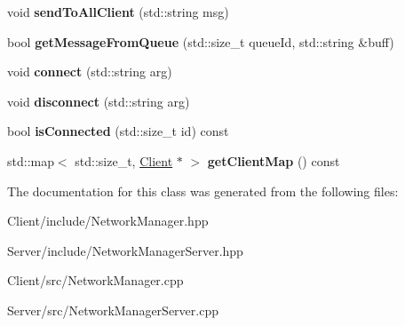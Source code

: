 \begin{DoxyCompactItemize}
\item 
void {\bfseries send\+To\+All\+Client} (std\+::string msg)\hypertarget{class_network_manager_aefe878eaf488595299a2705a82820af4}{}\label{class_network_manager_aefe878eaf488595299a2705a82820af4}

\item 
bool {\bfseries get\+Message\+From\+Queue} (std\+::size\+\_\+t queue\+Id, std\+::string \&buff)\hypertarget{class_network_manager_ae19dbcb8807aad17c2b691b330bf3dcc}{}\label{class_network_manager_ae19dbcb8807aad17c2b691b330bf3dcc}

\item 
void {\bfseries connect} (std\+::string arg)\hypertarget{class_network_manager_a8d1cf066c4e6d375d2b7b1691930ef2c}{}\label{class_network_manager_a8d1cf066c4e6d375d2b7b1691930ef2c}

\item 
void {\bfseries disconnect} (std\+::string arg)\hypertarget{class_network_manager_a3fd0153d570eb8c8e6aedd125561fcd3}{}\label{class_network_manager_a3fd0153d570eb8c8e6aedd125561fcd3}

\item 
bool {\bfseries is\+Connected} (std\+::size\+\_\+t id) const \hypertarget{class_network_manager_a8f5da4c018d07466d731294761714084}{}\label{class_network_manager_a8f5da4c018d07466d731294761714084}

\item 
std\+::map$<$ std\+::size\+\_\+t, \hyperlink{class_client}{Client} $\ast$ $>$ {\bfseries get\+Client\+Map} () const \hypertarget{class_network_manager_a02f97461ffc22210fd0ed253c496c871}{}\label{class_network_manager_a02f97461ffc22210fd0ed253c496c871}

\end{DoxyCompactItemize}


The documentation for this class was generated from the following files\+:\begin{DoxyCompactItemize}
\item 
Client/include/Network\+Manager.\+hpp\item 
Server/include/Network\+Manager\+Server.\+hpp\item 
Client/src/Network\+Manager.\+cpp\item 
Server/src/Network\+Manager\+Server.\+cpp\end{DoxyCompactItemize}
